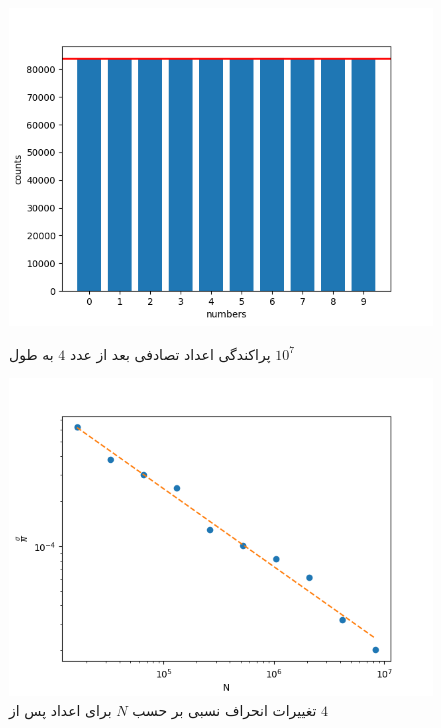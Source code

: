 \documentclass[11pt, a4paper]{article}
\begin{document}
\begin{figure}[h!]
	\centering
  \begin{minipage}[b]{0.48\textwidth}
    \includegraphics[width=\textwidth]{q2_histogram_4_14_24_2.png}
    \caption{پراکندگی اعداد تصادفی بعد از عدد $4$ به طول $10^7$}
    \label{fig:q2_histogram}
  \end{minipage}
  \hfill
  \begin{minipage}[b]{0.48\textwidth}
    \includegraphics[width=\textwidth]{q2_sigma_4_14_24_2.png}
    \caption{تغییرات انحراف نسبی بر حسب $N$ برای اعداد پس از $4$}
    \label{fig:q2_sigma}
  \end{minipage}
\end{figure}
\end{document}
